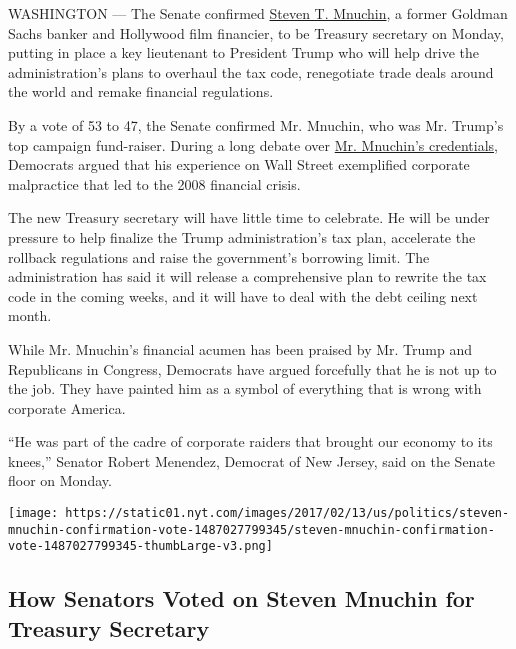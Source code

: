 WASHINGTON --- The Senate confirmed
\href{https://www.nytimes.com/2016/11/30/business/steven-mnuchin-expected-treasury-pick-is-an-outsider-to-public-policy.html}{Steven
T. Mnuchin}, a former Goldman Sachs banker and Hollywood film financier,
to be Treasury secretary on Monday, putting in place a key lieutenant to
President Trump who will help drive the administration's plans to
overhaul the tax code, renegotiate trade deals around the world and
remake financial regulations.

By a vote of 53 to 47, the Senate confirmed Mr. Mnuchin, who was Mr.
Trump's top campaign fund-raiser. During a long debate over
\href{https://www.nytimes.com/2017/01/19/us/politics/steven-mnuchin-treasury-confirmation-hearing.html}{Mr.
Mnuchin's credentials}, Democrats argued that his experience on Wall
Street exemplified corporate malpractice that led to the 2008 financial
crisis.

The new Treasury secretary will have little time to celebrate. He will
be under pressure to help finalize the Trump administration's tax plan,
accelerate the rollback regulations and raise the government's borrowing
limit. The administration has said it will release a comprehensive plan
to rewrite the tax code in the coming weeks, and it will have to deal
with the debt ceiling next month.

While Mr. Mnuchin's financial acumen has been praised by Mr. Trump and
Republicans in Congress, Democrats have argued forcefully that he is not
up to the job. They have painted him as a symbol of everything that is
wrong with corporate America.

``He was part of the cadre of corporate raiders that brought our economy
to its knees,'' Senator Robert Menendez, Democrat of New Jersey, said on
the Senate floor on Monday.

\href{https://www.nytimes.com/interactive/2017/02/13/us/politics/steven-mnuchin-confirmation-vote.html}{}

\texttt{[image: https://static01.nyt.com/images/2017/02/13/us/politics/steven-mnuchin-confirmation-vote-1487027799345/steven-mnuchin-confirmation-vote-1487027799345-thumbLarge-v3.png]}

\hypertarget{how-senators-voted-on-steven-mnuchin-for-treasury-secretary}{%
\subsection{How Senators Voted on Steven Mnuchin for Treasury
Secretary}\label{how-senators-voted-on-steven-mnuchin-for-treasury-secretary}}

